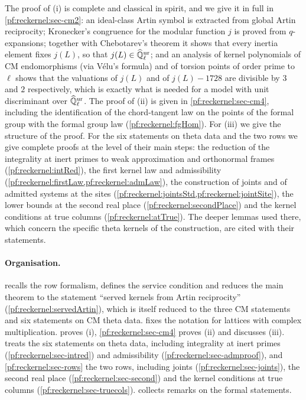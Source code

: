 The proof of (i) is complete and classical in spirit, and we give it in full in
\cref{pf:reckernel:sec-cm2}: an ideal-class Artin symbol is extracted from global Artin reciprocity; Kronecker's
congruence for the modular function $j$ is proved from $q$-expansions; together with Chebotarev's theorem it
shows that every inertia element fixes $j(L)$, so that $j(L)\in\widehat{\mathbb{Q}}{}_\ell^{\mathrm{ur}}$; and an analysis of kernel polynomials
of CM endomorphisms (via V\'elu's formula) and of torsion points of order prime to $\ell$ shows that the
valuations of $j(L)$ and of $j(L)-1728$ are divisible by $3$ and $2$ respectively, which is exactly what is needed
for a model with unit discriminant over $\widehat{\mathbb{Q}}{}_\ell^{\mathrm{ur}}$. The proof of (ii) is given in \cref{pf:reckernel:sec-cm4},
including the identification of the chord-tangent law on the points of the formal group with the formal group law
(\cref{pf:reckernel:fgHom}). For (iii) we give the structure of the proof. For the six statements on theta data and the
two rows we give complete proofs at the level of their main steps: the reduction of the integrality at inert primes to
weak approximation and orthonormal frames (\cref{pf:reckernel:intRed}), the first kernel law and admissibility
(\cref{pf:reckernel:firstLaw,pf:reckernel:admLaw}), the construction of joints and of admitted systems at the sites
(\cref{pf:reckernel:jointsStd,pf:reckernel:jointSite}), the lower bounds at the second real place
(\cref{pf:reckernel:secondPlace}) and the kernel conditions at true columns (\cref{pf:reckernel:atTrue}). The deeper
lemmas used there, which concern the specific theta kernels of the construction, are cited with their statements.

\paragraph{Organisation.}
 recalls the row formalism, defines the service condition and reduces the main
theorem to the statement ``served kernels from Artin reciprocity'' (\cref{pf:reckernel:servedArtin}), which is
itself reduced to the three CM statements and six statements on CM theta data.  fixes
the notation for lattices with complex multiplication.  proves (i),
\cref{pf:reckernel:sec-cm4} proves (ii) and discusses (iii).  treats the six statements
on theta data, including integrality at inert primes (\cref{pf:reckernel:sec-intred}) and admissibility
(\cref{pf:reckernel:sec-admproof}), and \cref{pf:reckernel:sec-rows} the two rows, including joints
(\cref{pf:reckernel:sec-joints}), the second real place (\cref{pf:reckernel:sec-second}) and the kernel conditions at
true columns (\cref{pf:reckernel:sec-truecols}).  collects remarks on the
formal statements.

